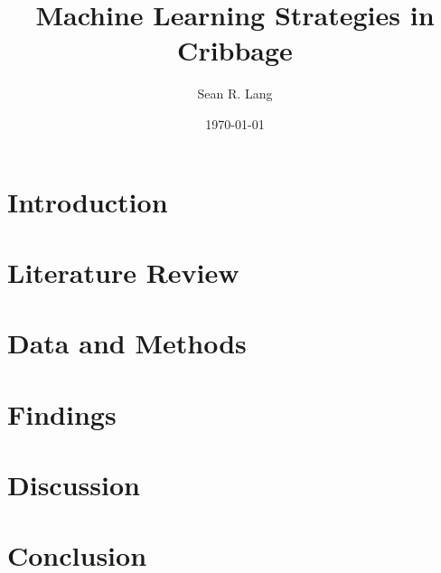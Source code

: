 \documentclass[english]{tktltiki}
\begin{document}

\title{Machine Learning Strategies in Cribbage}
\author{Sean R. Lang}
\date{\today}

\maketitle

\classification{\protect{\ \\
	}
}


\begin{abstract}

\end{abstract}


\section{Introduction}



\section{Literature Review}



\section{Data and Methods}



\section{Findings}



\section{Discussion}



\section{Conclusion}



\nocite{*}





\end{document}
